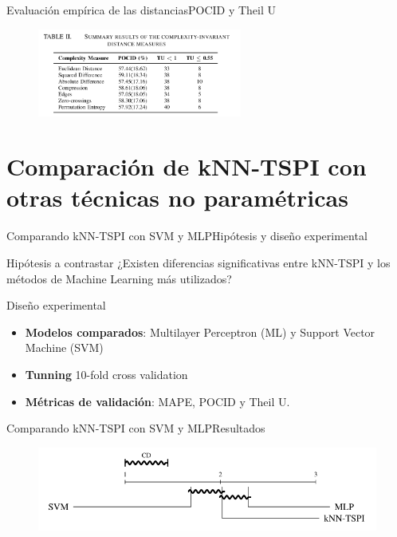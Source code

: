 \documentclass[12pt, aspectratio=169]{beamer} %
\begin{document}
\begin{frame}{Evaluación empírica de las distancias}{POCID y Theil U}
  \begin{figure}
    \includegraphics[width=0.6\textwidth]{20210313_5_tabla_cid.png}
  \end{figure}
\end{frame}


\section{Comparación de kNN-TSPI con otras técnicas no paramétricas}

\begin{frame}{Comparando kNN-TSPI con SVM y MLP}{Hipótesis y diseño experimental}

  \begin{block}{Hipótesis a contrastar}
    ¿Existen diferencias significativas entre kNN-TSPI y los métodos de Machine Learning más utilizados?
  \end{block}

  \begin{block}{Diseño experimental}
    \begin{itemize}
    \item \textbf{Modelos comparados}: Multilayer Perceptron (ML) y Support Vector Machine (SVM)
    \item \textbf{Tunning} 10-fold cross validation
    \item \textbf{Métricas de validación}: MAPE, POCID y Theil U.
    \end{itemize}
  \end{block}
  
\end{frame}

\begin{frame}{Comparando kNN-TSPI con SVM y MLP}{Resultados}
  \begin{figure}
    \includegraphics[width=\textwidth]{20210314_1_nemnyi_distancias_tecnicas_cd.png}
  \end{figure}
\end{frame}
\end{document}
